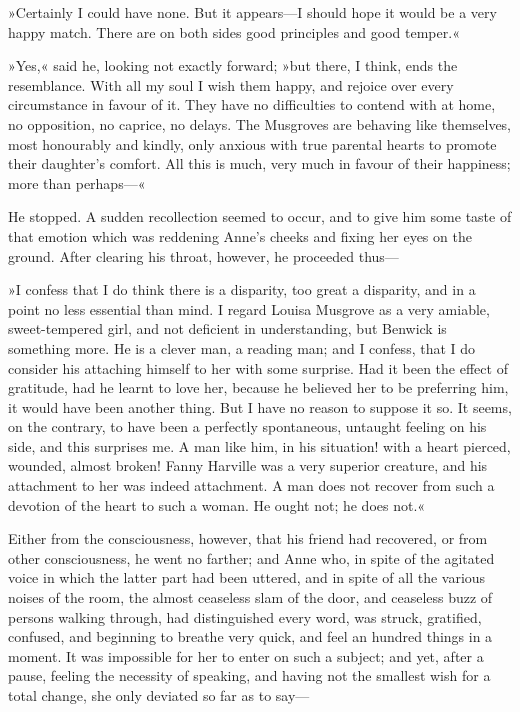 »Certainly I could have none. But it appears—I should hope it would be a very happy match. There are on both sides good principles and good temper.«

»Yes,« said he, looking not exactly forward; »but there, I think, ends the resemblance. With all my soul I wish them happy, and rejoice over every circumstance in favour of it. They have no difficulties to contend with at home, no opposition, no caprice, no delays. The Musgroves are behaving like themselves, most honourably and kindly, only anxious with true parental hearts to promote their daughter's comfort. All this is much, very much in favour of their happiness; more than perhaps—«

He stopped. A sudden recollection seemed to occur, and to give him some taste of that emotion which was reddening Anne's cheeks and fixing her eyes on the ground. After clearing his throat, however, he proceeded thus—

»I confess that I do think there is a disparity, too great a disparity, and in a point no less essential than mind. I regard Louisa Musgrove as a very amiable, sweet-tempered girl, and not deficient in understanding, but Benwick is something more. He is a clever man, a reading man; and I confess, that I do consider his attaching himself to her with some surprise. Had it been the effect of gratitude, had he learnt to love her, because he believed her to be preferring him, it would have been another thing. But I have no reason to suppose it so. It seems, on the contrary, to have been a perfectly spontaneous, untaught feeling on his side, and this surprises me. A man like him, in his situation! with a heart pierced, wounded, almost broken! Fanny Harville was a very superior creature, and his attachment to her was indeed attachment. A man does not recover from such a devotion of the heart to such a woman. He ought not; he does not.«

Either from the consciousness, however, that his friend had recovered, or from other consciousness, he went no farther; and Anne who, in spite of the agitated voice in which the latter part had been uttered, and in spite of all the various noises of the room, the almost ceaseless slam of the door, and ceaseless buzz of persons walking through, had distinguished every word, was struck, gratified, confused, and beginning to breathe very quick, and feel an hundred things in a moment. It was impossible for her to enter on such a subject; and yet, after a pause, feeling the necessity of speaking, and having not the smallest wish for a total change, she only deviated so far as to say—

